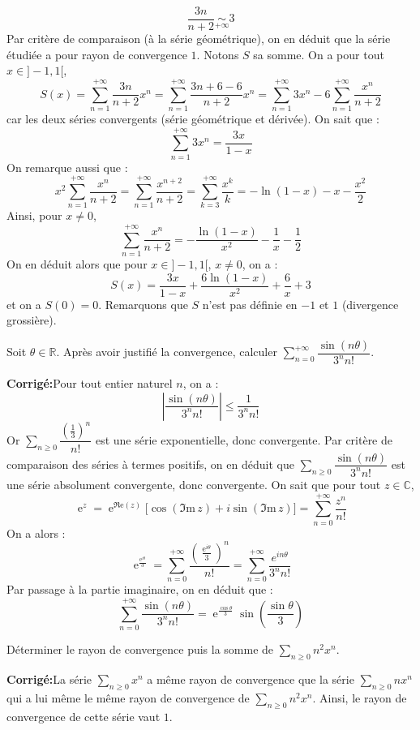 \documentclass[a4paper,twoside,french,11pt]{VcCours}
\DeclareMathOperator{\e}{e}
\newcommand{\Sum}[2]{\sum_{#1}^{#2}}
\newcommand{\corr}{\textbf{Corrigé:}}
\begin{document}
$$  \dfrac{3n}{n+2} \underset{+ \infty}{\sim} 3$$
Par critère de comparaison (à la série géométrique), on en déduit que la série étudiée a pour rayon de convergence $1$. Notons $S$ sa somme. On a pour tout $x \in ]-1,1[$,
$$ S(x) = \sum_{n=1}^{+ \infty}  \dfrac{3n}{n+2} x^n = \sum_{n=1}^{+ \infty}  \dfrac{3n+6-6}{n+2} x^n = \sum_{n=1}^{+ \infty} 3x^n - 6 \sum_{n=1}^{+ \infty} \dfrac{x^n}{n+2}$$
car les deux séries convergents (série géométrique et dérivée). On sait que :
$$ \sum_{n=1}^{+ \infty} 3x^n = \dfrac{3x}{1-x}$$
On remarque aussi que :
$$ x^2 \sum_{n=1}^{+ \infty} \dfrac{x^n}{n+2} = \sum_{n=1}^{+ \infty} \dfrac{x^{n+2}}{n+2} = \sum_{k=3}^{+\infty} \dfrac{x^k}{k} = - \ln(1-x) -x - \dfrac{x^2}{2}   $$
Ainsi, pour $x \neq 0$,
$$ \sum_{n=1}^{+ \infty} \dfrac{x^n}{n+2} = - \dfrac{\ln(1-x)}{x^2} - \dfrac{1}{x} - \dfrac{1}{2}$$
On en déduit alors que pour $x \in ]-1,1[$, $x \neq 0$, on a :
$$ S(x) =  \dfrac{3x}{1-x}  + \dfrac{6\ln(1-x)}{x^2} + \dfrac{6}{x} +3$$
et on a $S(0)= 0$. Remarquons que $S$ n'est pas définie en $-1$ et $1$ (divergence grossière).

\begin{Exercice}{} Soit $\theta\in\mathbb{R}$. Après avoir justifié la convergence, calculer $\sum_{n=0}^{+\infty}\dfrac{\sin(n\theta)}{3^nn!}$.
\end{Exercice}

\corr Pour tout entier naturel $n$, on a : 
\[
\left\vert\dfrac{\sin(n\theta)}{3^n n!}\right\vert\leq \dfrac{1}{3^n n!}
\]
Or $\Sum{n \geq 0}{} \dfrac{(\frac{1}{3})^n}{ n!}$ est une série exponentielle, donc convergente. Par critère de comparaison des séries à termes positifs, on en déduit que $\Sum{n \geq 0}{} \dfrac{\sin(n\theta)}{3^n n!}$ est une série absolument convergente, donc convergente. On sait que pour tout $z \in \mathbb{C}$,
$$\e^{z}=\e^{\Re\mathrm{e}(z)}\big[\cos(\Im\mathrm{m}\,z)+i\sin(\Im\mathrm{m}\,z) \big]= \sum_{n =0}^{+ \infty} \dfrac{z^n}{n!}$$
On a alors : 
$$ \e^{\frac{\e^{i\theta}}{3}}= \sum_{n=0}^{+\infty}\dfrac{(\frac{\e^{i\theta}}{3})^n}{n!} = \sum_{n=0}^{+ \infty} \dfrac{e^{i n \theta}}{3^n n!}$$
Par passage à la partie imaginaire, on en déduit que :
$$ \sum_{n=0}^{+\infty}\dfrac{\sin(n\theta)}{3^nn!} = \e^{\frac{\cos\theta}{3}}\sin\left(\dfrac{\sin\theta}{3}\right)$$

\begin{Exercice}{} Déterminer le rayon de convergence puis la somme de $\Sum{n \geq 0}{} n^2x^n$.
\end{Exercice}

\corr La série $\Sum{n \geq 0}{} x^n$ a même rayon de convergence que  la série $\Sum{n \geq 0}{} nx^n$ qui a lui même le même rayon de convergence de $\Sum{n \geq 0}{} n^2x^n$. Ainsi, le rayon de convergence de cette série vaut $1$.
\end{document}
